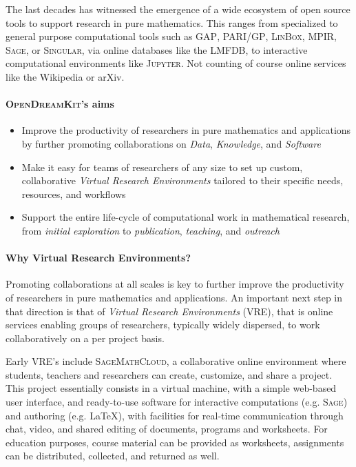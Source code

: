 \documentclass{llncs}
\newcommand{\software}[1]{\textsc{#1}\xspace}
\newcommand{\GAP}{\software{GAP}}
\newcommand{\Singular}{\software{Singular}}
\newcommand{\Sage}{\software{Sage}}
\newcommand{\Jupyter}{\software{Jupyter}}
\newcommand{\PariGP}{\software{PARI/GP}}
\newcommand{\Linbox}{\software{LinBox}}
\newcommand{\LMFDB}{\software{LMFDB}}
\newcommand{\SMC}{\software{SageMathCloud}}
\newcommand{\MPIR}{\software{MPIR}}
\newcommand{\ODK}{\software{OpenDreamKit}}
\begin{document}
The last decades has witnessed the emergence of a wide ecosystem of
open source tools to support research in pure mathematics. This ranges
from specialized to general purpose computational tools such as \GAP,
\PariGP, \Linbox, \MPIR, \Sage, or \Singular, via online databases
like the \LMFDB, to interactive computational environments like
\Jupyter. Not counting of course online services like the Wikipedia or
arXiv.

\paragraph{\ODK's aims}

\begin{itemize}
\item Improve the productivity of researchers in pure mathematics and
  applications by further promoting collaborations on \emph{Data},
  \emph{Knowledge}, and \emph{Software}
\item Make it easy for teams of researchers of any size to set up custom,
  collaborative \emph{Virtual Research Environments} tailored to their
  specific needs, resources, and workflows
\item Support the entire life-cycle of computational work in
  mathematical research, from \emph{initial exploration} to
  \emph{publication}, \emph{teaching}, and \emph{outreach}
\end{itemize}

\paragraph{Why Virtual Research Environments?}

Promoting collaborations at all scales is key to further improve the
productivity of researchers in pure mathematics and applications.  An
important next step in that direction is that of \emph{Virtual
  Research Environments} (VRE), that is online services enabling
groups of researchers, typically widely dispersed, to work
collaboratively on a per project basis.


Early VRE's include \SMC, a collaborative online environment
where students, teachers and researchers can create, customize, and
share a project. This project essentially consists in a virtual
machine, with a simple web-based user interface, and ready-to-use
software for interactive computations (e.g. \Sage) and authoring
(e.g. \LaTeX), with facilities for real-time communication through
chat, video, and shared editing of documents, programs and worksheets.
For education purposes, course material can be provided as worksheets,
assignments can be distributed, collected, and returned as well.
\end{document}
